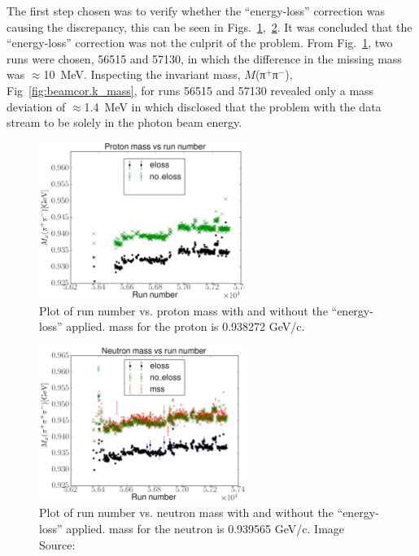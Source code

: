 The first step chosen was to verify whether the ``energy-loss'' correction was causing the discrepancy, this can be seen in Figs.~\ref{fig:beamcor.p_mass},~\ref{fig:beamcor.n_mass}. It was concluded that the ``energy-loss'' correction was not the culprit of the problem. From Fig.~\ref{fig:beamcor.p_mass}, two runs were chosen, 56515 and 57130, in which the difference in the missing mass was $\approx$10~MeV. Inspecting the invariant mass, $M$(π$^+$π$^-$), Fig~\ref{fig:beamcor.k_mass}, for runs 56515 and 57130 revealed only a mass deviation of $\approx$1.4~MeV in which disclosed that the problem with the  data stream to be solely in the photon beam energy.


\begin{figure}\begin{center}
\includegraphics[width=0.6\textwidth]{figures/calib/tag/ecor/P_mass_issue.eps}
\caption[Run Number vs. Proton Mass ]{\label{fig:beamcor.p_mass}Plot of  run number vs. proton mass with and without the ``energy-loss'' applied.  mass for the proton is 0.938272 GeV/c. }
\end{center}\end{figure}

\begin{figure}\begin{center}
\includegraphics[width=0.6\textwidth]{figures/calib/tag/ecor/N_mass_issue.eps}
\caption[Run Number vs. Neutron Mass]{\label{fig:beamcor.n_mass}Plot of  run number vs. neutron mass with and without the ``energy-loss'' applied.  mass for the neutron is 0.939565 GeV/c. Image Source:~\cite{bookwalter}}
\end{center}\end{figure}

